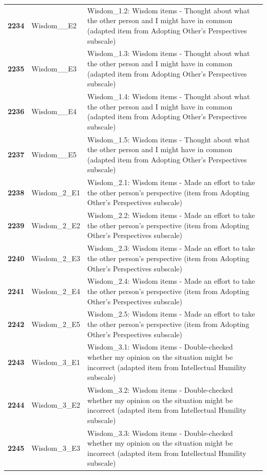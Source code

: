 \documentclass[
  letterpaper,
  DIV=11,
  numbers=noendperiod]{scrartcl}
\begin{document}
\begin{longtable}[t]{>{}cll}
\textbf{2234} & Wisdom\_\_E2 & Wisdom\_1.2: Wisdom items - Thought about what the other person and I might have in common (adapted item from Adopting Other's Perspectives subscale)\\
\textbf{2235} & Wisdom\_\_E3 & Wisdom\_1.3: Wisdom items - Thought about what the other person and I might have in common (adapted item from Adopting Other's Perspectives subscale)\\
\addlinespace
\textbf{2236} & Wisdom\_\_E4 & Wisdom\_1.4: Wisdom items - Thought about what the other person and I might have in common (adapted item from Adopting Other's Perspectives subscale)\\
\textbf{2237} & Wisdom\_\_E5 & Wisdom\_1.5: Wisdom items - Thought about what the other person and I might have in common (adapted item from Adopting Other's Perspectives subscale)\\
\textbf{2238} & Wisdom\_2\_E1 & Wisdom\_2.1: Wisdom items - Made an effort to take the other person's perspective (item from Adopting Other's Perspectives subscale)\\
\textbf{2239} & Wisdom\_2\_E2 & Wisdom\_2.2: Wisdom items - Made an effort to take the other person's perspective (item from Adopting Other's Perspectives subscale)\\
\textbf{2240} & Wisdom\_2\_E3 & Wisdom\_2.3: Wisdom items - Made an effort to take the other person's perspective (item from Adopting Other's Perspectives subscale)\\
\addlinespace
\textbf{2241} & Wisdom\_2\_E4 & Wisdom\_2.4: Wisdom items - Made an effort to take the other person's perspective (item from Adopting Other's Perspectives subscale)\\
\textbf{2242} & Wisdom\_2\_E5 & Wisdom\_2.5: Wisdom items - Made an effort to take the other person's perspective (item from Adopting Other's Perspectives subscale)\\
\textbf{2243} & Wisdom\_3\_E1 & Wisdom\_3.1: Wisdom items - Double-checked whether my opinion on the situation might be incorrect (adapted item from Intellectual Humility subscale)\\
\textbf{2244} & Wisdom\_3\_E2 & Wisdom\_3.2: Wisdom items - Double-checked whether my opinion on the situation might be incorrect (adapted item from Intellectual Humility subscale)\\
\textbf{2245} & Wisdom\_3\_E3 & Wisdom\_3.3: Wisdom items - Double-checked whether my opinion on the situation might be incorrect (adapted item from Intellectual Humility subscale)\\

\end{longtable}
\end{document}
